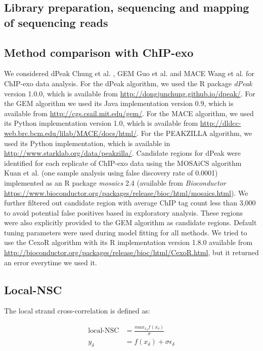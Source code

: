 \documentclass{bmcart}\usepackage[]{graphicx}\usepackage[]{color}
\begin{document}
\subsection{Library preparation, sequencing and mapping of sequencing reads}
\label{sec:library}

\color{black}

\subsection{Method comparison with ChIP-exo}
\label{sec:suppcomp}

We considered dPeak Chung et al. \cite{dpeak}, GEM Guo et
al. \cite{gem} and MACE Wang et al. \cite{mace} for ChIP-exo data
analysis. For the dPeak algorithm, we used the R package \emph{dPeak}
version 1.0.0, which is available from
\url{http://dongjunchung.github.io/dpeak/}. For the GEM algorithm we
used its Java implementation version 0.9, which is available from
\url{http://cgs.csail.mit.edu/gem/}. For the MACE algorithm, we used
its Python implementation version 1.0, which is available from
\url{http://dldcc-web.brc.bcm.edu/lilab/MACE/docs/html/}. For the
PEAKZILLA algorithm, we used its Python implementation, which is
available in \url{http://www.starklab.org/data/peakzilla/}. Candidate
regions for dPeak were identified for each replicate of ChIP-exo data
using the MOSAiCS algorithm Kuan et al. \cite{mosaics} (one sample
analysis using false discovery rate of 0.0001) implemented as an R
package \emph{mosaics} 2.4 (available from \emph{Bioconductor}
\url{https://www.bioconductor.org/packages/release/bioc/html/mosaics.html}). We
further filtered out candidate region with average ChIP tag count less
than 3,000 to avoid potential false positives based in exploratory
analysis. These regions were also explicitly provided to the GEM
algorithm as candidate regions. Default tuning parameters were used
during model fitting for all methods. We tried to use the CexoR
algorithm with its R implementation version 1.8.0 available from
\url{http://bioconductor.org/packages/release/bioc/html/CexoR.html},
but it returned an error everytime we used it.

\subsection{Local-NSC}
\label{sec:localnsc}

The local strand cross-correlation is defined as:

\begin{align}
  \mbox{local-NSC} &= \frac{max_{x_\delta} f(x_\delta)}{\sigma} \nonumber \\
 y_\delta &= f(x_\delta) + \sigma \epsilon_\delta \nonumber
\end{align}
\end{document}
